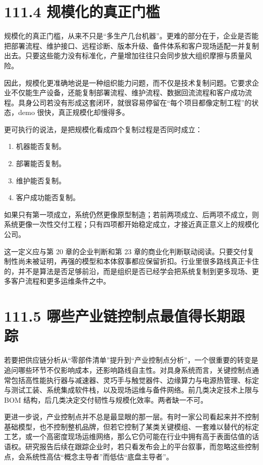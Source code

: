 \section*{111.4 规模化的真正门槛}


规模化的真正门槛，从来不只是“多生产几台机器”。更难的部分在于，企业是否能把部署流程、维护接口、远程诊断、版本升级、备件体系和客户现场适配一并复制出去。只要这些能力没有标准化，产量增加往往只会同步放大组织摩擦与质量风险。

因此，规模化更准确地说是一种组织能力问题，而不仅是技术复制问题。它要求企业不仅能生产设备，还能复制部署流程、维护流程、数据回流流程和客户成功流程。具身公司若没有形成这套闭环，就很容易停留在“每个项目都像定制工程”的状态，demo 很快，真正规模化却慢得多。

更可执行的说法，是把规模化看成四个复制过程是否同时成立：

\begin{enumerate}
\item 机器能否复制。
\item 部署能否复制。
\item 维护能否复制。
\item 客户成功能否复制。
\end{enumerate}

如果只有第一项成立，系统仍然更像原型制造；若前两项成立、后两项不成立，则系统更像一次性交付工程；只有四项都开始稳定成立，才接近真正意义上的规模化公司。

这一定义应与第 20 章的企业判断和第 23 章的商业化判断联动阅读。只要交付复制性尚未被证明，再强的模型和本体叙事都应保留折扣。行业里很多路线真正卡住的，并不是算法是否足够前沿，而是组织是否已经学会把系统复制到更多现场、更多客户流程和更多运维条件之中。

\section*{111.5 哪些产业链控制点最值得长期跟踪}


若要把供应链分析从“零部件清单”提升到“产业控制点分析”，一个很重要的转变是追问哪些环节不仅影响成本，还影响路线自主性。对具身系统而言，关键控制点通常包括高性能执行器与减速器、灵巧手与触觉器件、边缘算力与电源热管理、标定与测试工装、系统集成软件栈，以及现场运维与备件网络。前几类决定技术上限与 BOM 结构，后几类决定交付韧性与规模化效率。两者缺一不可。

更进一步说，产业控制点并不总是最显眼的那一层。有时一家公司看起来并不控制基础模型，也不控制整机品牌，但若它控制了某类关键模组、一套难以替代的标定工艺，或一个高密度现场运维网络，那么它仍可能在行业中拥有高于表面估值的话语权。研究报告后续在跟踪企业时，若只看发布会上的平台叙事，而忽略这些控制点，会系统性高估“概念主导者”而低估“底盘主导者”。

